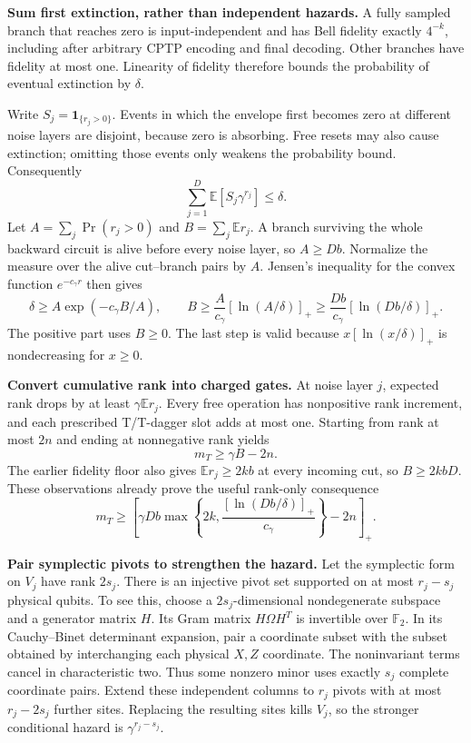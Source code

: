 \documentclass[11pt,a4paper]{article}
\numberwithin{equation}{section}
\theoremstyle{remark}\newtheorem*{remark}{Interpretation}
\newcommand{\E}{\mathbb E}
\newcommand{\positive}[1]{\left[#1\right]_+}
\begin{document}
\textbf{Sum first extinction, rather than independent hazards.}
A fully sampled branch that reaches zero is input-independent and has Bell fidelity exactly $4^{-k}$, including after arbitrary CPTP encoding and final decoding. Other branches have fidelity at most one. Linearity of fidelity therefore bounds the probability of eventual extinction by $\delta$.

Write $S_j=\mathbf1_{\{r_j>0\}}$. Events in which the envelope first becomes zero at different noise layers are disjoint, because zero is absorbing. Free resets may also cause extinction; omitting those events only weakens the probability bound. Consequently
\begin{equation}
\sum_{j=1}^{D}\E[S_j\gamma^{r_j}]\le\delta.
\label{eq:extinction-hazards}
\end{equation}
Let $A=\sum_j\Pr(r_j>0)$ and $B=\sum_j\E r_j$. A branch surviving the whole backward circuit is alive before every noise layer, so $A\ge Db$. Normalize the measure over the alive cut--branch pairs by $A$. Jensen's inequality for the convex function $e^{-c_\gamma r}$ then gives
\begin{equation}
\delta\ge A\exp(-c_\gamma B/A),\qquad
B\ge\frac{A}{c_\gamma}[\ln(A/\delta)]_+
\ge\frac{Db}{c_\gamma}[\ln(Db/\delta)]_+.
\label{eq:cumulative-rank}
\end{equation}
The positive part uses $B\ge0$. The last step is valid because $x[\ln(x/\delta)]_+$ is nondecreasing for $x\ge0$.

\textbf{Convert cumulative rank into charged gates.}
At noise layer $j$, expected rank drops by at least $\gamma\E r_j$. Every free operation has nonpositive rank increment, and each prescribed T/T-dagger slot adds at most one. Starting from rank at most $2n$ and ending at nonnegative rank yields
\begin{equation}
 m_T\ge\gamma B-2n.
\label{eq:reliability-telescope}
\end{equation}
The earlier fidelity floor also gives $\E r_j\ge2kb$ at every incoming cut, so $B\ge2kbD$. These observations already prove the useful rank-only consequence
\begin{equation}
m_T\ge\positive{\gamma Db\max\left\{2k,
\frac{[\ln(Db/\delta)]_+}{c_\gamma}\right\}-2n}.
\label{eq:reliability-coarse}
\end{equation}

\textbf{Pair symplectic pivots to strengthen the hazard.}
Let the symplectic form on $V_j$ have rank $2s_j$. There is an injective pivot set supported on at most $r_j-s_j$ physical qubits. To see this, choose a $2s_j$-dimensional nondegenerate subspace and a generator matrix $H$. Its Gram matrix $H\Omega H^T$ is invertible over $\mathbb F_2$. In its Cauchy--Binet determinant expansion, pair a coordinate subset with the subset obtained by interchanging each physical $X,Z$ coordinate. The noninvariant terms cancel in characteristic two. Thus some nonzero minor uses exactly $s_j$ complete coordinate pairs. Extend these independent columns to $r_j$ pivots with at most $r_j-2s_j$ further sites. Replacing the resulting sites kills $V_j$, so the stronger conditional hazard is $\gamma^{r_j-s_j}$.
\end{document}
